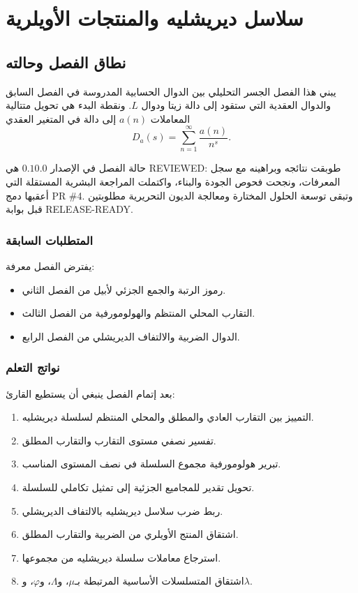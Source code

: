 \chapter{سلاسل ديريشليه والمنتجات الأويلرية}

\section{نطاق الفصل وحالته}

يبني هذا الفصل الجسر التحليلي بين الدوال الحسابية المدروسة في الفصل
السابق والدوال العقدية التي ستقود إلى دالة زيتا ودوال \(L\). ونقطة البدء هي
تحويل متتالية المعاملات \(a(n)\) إلى دالة في المتغير العقدي
\[
D_a(s)=\sum_{n=1}^{\infty}\frac{a(n)}{n^s}.
\]

حالة الفصل في الإصدار \(0.10.0\) هي \textenglish{REVIEWED}: طوبقت
نتائجه وبراهينه مع سجل المعرفات، ونجحت فحوص الجودة والبناء، واكتملت
المراجعة البشرية المستقلة التي أعقبها دمج \textenglish{PR \#4}. وتبقى
توسعة الحلول المختارة ومعالجة الديون التحريرية مطلوبتين قبل بوابة
\textenglish{RELEASE-READY}.

\subsection{المتطلبات السابقة}

يفترض الفصل معرفة:

\begin{itemize}
  \item رموز الرتبة والجمع الجزئي لأبيل من الفصل الثاني.
  \item التقارب المحلي المنتظم والهولومورفية من الفصل الثالث.
  \item الدوال الضربية والالتفاف الديريشلي من الفصل الرابع.
\end{itemize}

\subsection{نواتج التعلم}

بعد إتمام الفصل ينبغي أن يستطيع القارئ:

\begin{enumerate}
  \item التمييز بين التقارب العادي والمطلق والمحلي المنتظم لسلسلة ديريشليه.
  \item تفسير نصفي مستوى التقارب والتقارب المطلق.
  \item تبرير هولومورفية مجموع السلسلة في نصف المستوى المناسب.
  \item تحويل تقدير للمجاميع الجزئية إلى تمثيل تكاملي للسلسلة.
  \item ربط ضرب سلاسل ديريشليه بالالتفاف الديريشلي.
  \item اشتقاق المنتج الأويلري من الضربية والتقارب المطلق.
  \item استرجاع معاملات سلسلة ديريشليه من مجموعها.
  \item اشتقاق المتسلسلات الأساسية المرتبطة بـ\(\mu\)، و\(\Lambda\)،
  و\(\varphi\)، و\(\lambda\).
\end{enumerate}

